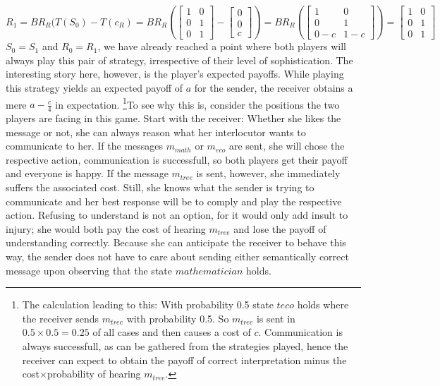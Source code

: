 \documentclass[10]{article}
\begin{document}
\begin{equation*}
R_1=BR_R(T(S_0)-T(c_R)=
BR_R(
\begin{bmatrix}
1 & 0\\
0 & 1\\
0 & 1
\end{bmatrix}
-
\begin{bmatrix}
0\\
0\\
c
\end{bmatrix}
)
=
BR_R(
\begin{bmatrix}
1 & 0\\
0 & 1\\
0-c & 1-c
\end{bmatrix}
)
=
\begin{bmatrix}
1 & 0\\
0 & 1\\
0 & 1
\end{bmatrix}
\end{equation*}
$S_0=S_1$ and $R_0=R_1$, we have already reached a point where both players will always play this pair of strategy, irrespective of their level of sophistication. The interesting story here, however, is the player's expected payoffs. While playing this strategy yields an expected payoff of $a$ for the sender, the receiver obtains a mere $a-\tfrac{c}{4}$ in expectation.
\footnote{The calculation leading to this: With probability 0.5 state $t{eco}$ holds where the receiver sends $m_{tree}$ with probability 0.5. So $m_{tree}$ is sent in $0.5\times 0.5 =0.25$ of all cases and then causes a cost of $c$. Communication is always successfull, as can be gathered from the strategies played, hence the receiver can expect to obtain the payoff of correct interpretation minus the cost$\times$probability of hearing $m_{tree}$.}To see why this is, consider the positions the two players are facing in this game. Start with the receiver: Whether she likes the message or not, she can always reason what her interlocutor wants to communicate to her. If the messages $m_{math}$ or $m_{eco}$ are sent, she will chose the respective action, communication is successfull, so both players get their payoff and everyone is happy. If the message $m_{tree}$ is sent, however, she immediately suffers the associated cost. Still, she knows what the sender is trying to communicate and her best response will be to comply and play the respective action. Refusing to understand is not an option, for it would only add insult to injury; she would both pay the cost of hearing $m_{tree}$ and lose the payoff of understanding correctly. Because she can anticipate the receiver to behave this way, the sender does not have to care about sending either semantically correct message upon observing that the state $mathematician$ holds.
\end{document}
